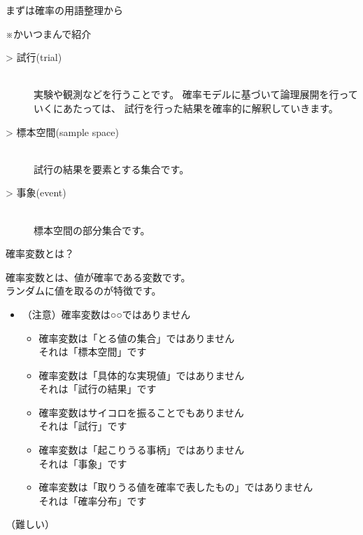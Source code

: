 \documentclass[dvipdfmx,cjk,handout]{beamer}
\begin{document}
\begin{frame}{まずは確率の用語整理から}

※かいつまんで紹介\pause

\vskip 1cm

\begin{description}

    \item[> 試行(trial)]\mbox{}\\
            実験や観測などを行うことです。
            確率モデルに基づいて論理展開を行っていくにあたっては、
            試行を行った結果を確率的に解釈していきます。\pause

    \item[> 標本空間(sample space)]\mbox{}\\
            試行の結果を要素とする集合です。\pause

    \item[> 事象(event)]\mbox{}\\
            標本空間の部分集合です。

\end{description}

\end{frame}


\begin{frame}{確率変数とは？}\pause

確率変数とは、値が確率である変数です。\\
ランダムに値を取るのが特徴です。\pause

\vskip 0.3cm

\begin{itemize}

    \item （注意）確率変数は○○ではありません \pause
        \begin{itemize}
        \item 確率変数は「とる値の集合」ではありません\\ \pause
                それは「標本空間」です \pause
        \item 確率変数は「具体的な実現値」ではありません\\ \pause
                それは「試行の結果」です \pause
        \item 確率変数はサイコロを振ることでもありません\\ \pause
                それは「試行」です \pause
        \item 確率変数は「起こりうる事柄」ではありません\\ \pause
                それは「事象」です \pause
        \item 確率変数は「取りうる値を確率で表したもの」ではありません\\ \pause
                それは「確率分布」です \pause
        \end{itemize}
\end{itemize}

\vskip 1cm

（難しい）

\end{frame}
\end{document}
